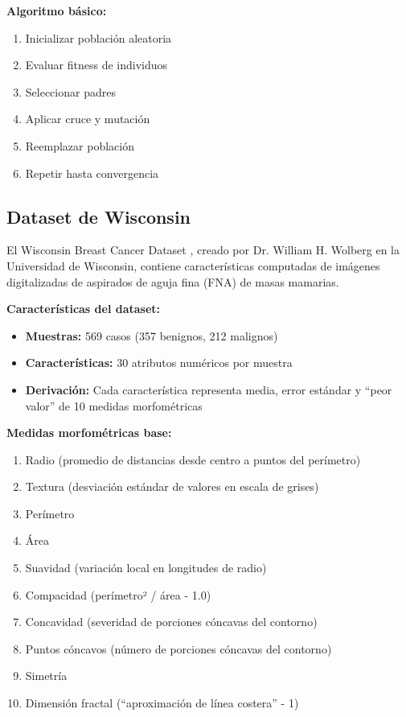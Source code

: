 \documentclass[12pt,a4paper]{article}
\begin{document}
\textbf{Algoritmo básico:}
\begin{enumerate}
    \item Inicializar población aleatoria
    \item Evaluar fitness de individuos
    \item Seleccionar padres
    \item Aplicar cruce y mutación
    \item Reemplazar población
    \item Repetir hasta convergencia
\end{enumerate}

\subsection{Dataset de Wisconsin}

El Wisconsin Breast Cancer Dataset \cite{street1993}, creado por Dr. William H. Wolberg en la Universidad de Wisconsin, contiene características computadas de imágenes digitalizadas de aspirados de aguja fina (FNA) de masas mamarias.

\textbf{Características del dataset:}
\begin{itemize}
    \item \textbf{Muestras:} 569 casos (357 benignos, 212 malignos)
    \item \textbf{Características:} 30 atributos numéricos por muestra
    \item \textbf{Derivación:} Cada característica representa media, error estándar y ``peor valor'' de 10 medidas morfométricas
\end{itemize}

\textbf{Medidas morfométricas base:}
\begin{enumerate}
    \item Radio (promedio de distancias desde centro a puntos del perímetro)
    \item Textura (desviación estándar de valores en escala de grises)
    \item Perímetro
    \item Área
    \item Suavidad (variación local en longitudes de radio)
    \item Compacidad (perímetro² / área - 1.0)
    \item Concavidad (severidad de porciones cóncavas del contorno)
    \item Puntos cóncavos (número de porciones cóncavas del contorno)
    \item Simetría
    \item Dimensión fractal (``aproximación de línea costera'' - 1)
\end{enumerate}
\end{document}
